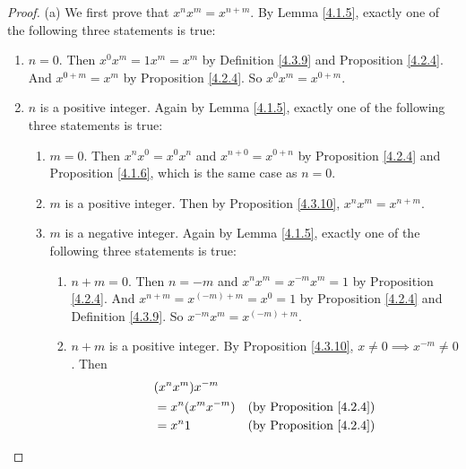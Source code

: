 \begin{proof}{(a)}
    We first prove that \(x^n x^m = x^{n + m}\).
    By Lemma \ref{4.1.5}, exactly one of the following three statements is true:
    \begin{enumerate}[label=(\Roman*)]
        \item \(n = 0\).
              Then \(x^0 x^m = 1x^m = x^m\) by Definition \ref{4.3.9} and Proposition \ref{4.2.4}.
              And \(x^{0 + m} = x^m\) by Proposition \ref{4.2.4}.
              So \(x^0 x^m = x^{0 + m}\).
        \item \(n\) is a positive integer.
              Again by Lemma \ref{4.1.5}, exactly one of the following three statements is true:
              \begin{enumerate}[label=(\roman*)]
                  \item \(m = 0\).
                        Then \(x^n x^0 = x^0 x^n\) and \(x^{n + 0} = x^{0 + n}\) by Proposition \ref{4.2.4} and Proposition \ref{4.1.6}, which is the same case as \(n = 0\).
                  \item \(m\) is a positive integer.
                        Then by Proposition \ref{4.3.10}, \(x^n x^m = x^{n + m}\).
                  \item \(m\) is a negative integer.
                        Again by Lemma \ref{4.1.5}, exactly one of the following three statements is true:
                        \begin{enumerate}[label=(\arabic*)]
                            \item \(n + m = 0\).
                                  Then \(n = -m\) and \(x^n x^m = x^{-m} x^m = 1\) by Proposition \ref{4.2.4}.
                                  And \(x^{n + m} = x^{(-m) + m} = x^0 = 1\) by Proposition \ref{4.2.4} and Definition \ref{4.3.9}.
                                  So \(x^{-m} x^m = x^{(-m) + m}\).
                            \item \(n + m\) is a positive integer.
                                  By Proposition \ref{4.3.10}, \(x \neq 0 \implies x^{-m} \neq 0\).
                                  Then
                                  \begin{align*}
                                       & (x^n x^m) x^{-m}                                            \\
                                       & = x^n (x^m x^{-m})   & \text{(by Proposition \ref{4.2.4})}  \\
                                       & = x^n 1              & \text{(by Proposition \ref{4.2.4})}  \\

\end{align*}
\end{enumerate}
\end{enumerate}
\end{enumerate}
\end{proof}
